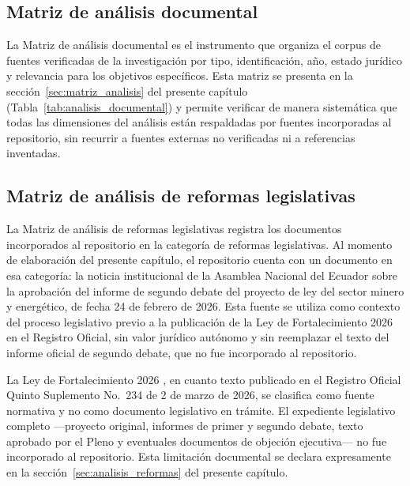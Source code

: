 \subsection{Matriz de análisis documental}

La Matriz de análisis documental es el instrumento que organiza el corpus de fuentes verificadas de la investigación por tipo, identificación, año, estado jurídico y relevancia para los objetivos específicos. Esta matriz se presenta en la sección~\ref{sec:matriz_analisis} del presente capítulo (Tabla~\ref{tab:analisis_documental}) y permite verificar de manera sistemática que todas las dimensiones del análisis están respaldadas por fuentes incorporadas al repositorio, sin recurrir a fuentes externas no verificadas ni a referencias inventadas.

\subsection{Matriz de análisis de reformas legislativas}

La Matriz de análisis de reformas legislativas registra los documentos incorporados al repositorio en la categoría de reformas legislativas. Al momento de elaboración del presente capítulo, el repositorio cuenta con un documento en esa categoría: la noticia institucional de la Asamblea Nacional del Ecuador sobre la aprobación del informe de segundo debate del proyecto de ley del sector minero y energético, de fecha 24 de febrero de 2026. Esta fuente se utiliza como contexto del proceso legislativo previo a la publicación de la Ley de Fortalecimiento 2026 en el Registro Oficial, sin valor jurídico autónomo y sin reemplazar el texto del informe oficial de segundo debate, que no fue incorporado al repositorio.

La Ley de Fortalecimiento 2026 \parencite{ley_fortalecimiento_2026}, en cuanto texto publicado en el Registro Oficial Quinto Suplemento No.\ 234 de 2 de marzo de 2026, se clasifica como fuente normativa y no como documento legislativo en trámite. El expediente legislativo completo ---proyecto original, informes de primer y segundo debate, texto aprobado por el Pleno y eventuales documentos de objeción ejecutiva--- no fue incorporado al repositorio. Esta limitación documental se declara expresamente en la sección~\ref{sec:analisis_reformas} del presente capítulo.

